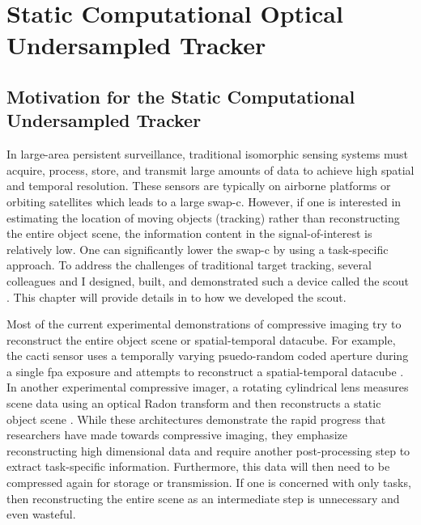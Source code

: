 \chapter{Static Computational Optical Undersampled Tracker}\label{chap:Scout}

\section{Motivation for the Static Computational Undersampled Tracker}

In large-area persistent surveillance, traditional \gls{isomorphic} sensing systems must acquire, process, store, and transmit large amounts of data to achieve high spatial and temporal resolution. These sensors are typically on airborne platforms or orbiting satellites which leads to a large \acrfull{swap-c}. However, if one is interested in estimating the location of moving objects (tracking) rather than reconstructing the entire object scene, the information content in the signal-of-interest is relatively low. One can significantly lower the \gls{swap-c} by using a task-specific approach. To address the challenges of traditional target tracking, several colleagues and I designed, built, and demonstrated such a device called the \acrfull{scout} \cite{townsend2012static, stenner2010static}. This chapter will provide details in to how we developed the \gls{scout}.

Most of the current experimental demonstrations of \gls{compressive imaging} try to reconstruct the entire object scene or spatial-temporal datacube. For example, the \gls{cacti} sensor uses a temporally varying psuedo-random coded aperture during a single \gls{fpa} exposure and attempts to reconstruct a spatial-temporal datacube \cite{llull2013coded}. In another experimental compressive imager, a rotating cylindrical lens measures scene data using an optical Radon transform and then reconstructs a static object scene \cite{evladov2012progressive}. While these architectures demonstrate the rapid progress that researchers have made towards compressive imaging, they emphasize reconstructing high dimensional data and require another post-processing step to extract task-specific information. Furthermore, this data will then need to be compressed again for storage or transmission. If one is concerned with only tasks, then reconstructing the entire scene as an intermediate step is unnecessary and even wasteful. 

